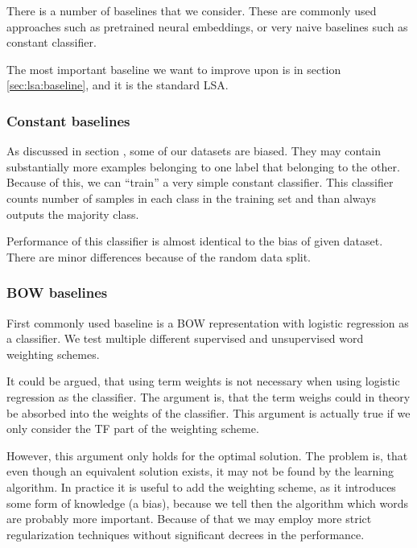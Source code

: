     There is a number of baselines that we consider.
    These are commonly used approaches such as pretrained neural embeddings, or very naive baselines such as constant classifier.
    
    The most important baseline we want to improve upon is in section \ref{sec:lsa:baseline}, 
    and it is the standard LSA.

    \subsubsection{Constant baselines}
    As discussed in section \label{sec:data:overview}, some of our datasets are biased. 
    They may contain substantially more examples belonging to one label that belonging to the other.
    Because of this, we can ``train'' a very simple constant classifier. 
    This classifier counts number of samples in each class in the training set and than always outputs the majority class.
    
    Performance of this classifier is almost identical to the bias of given dataset. 
    There are minor differences because of the random data split. 

    \* %
    
    \subsubsection{BOW baselines}    
    
    First commonly used baseline is a BOW representation with logistic regression as a classifier. 
    We test multiple different supervised and unsupervised word weighting schemes.
    
    It could be argued, that using term weights is not necessary when using logistic regression as the classifier.
    The argument is, that the term weighs could in theory be absorbed into the weights of the classifier. 
    This argument is actually true if we only consider the TF part of the weighting scheme.
    
    However, this argument only holds for the optimal solution. 
    The problem is, that even though an equivalent solution exists, it may not be found by the learning algorithm. 
    In practice it is useful to add the weighting scheme, 
    as it introduces some form of knowledge (a bias), 
    because we tell then the algorithm which words are probably more important.
    Because of that we may employ more strict regularization techniques without significant decrees in the performance.
    

